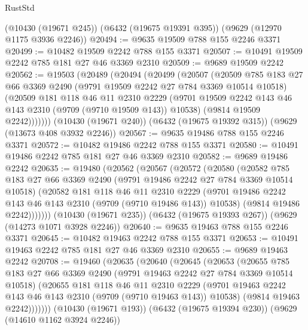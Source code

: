 \begin{lexlean}{RustStd}
\begin{coremodule}
    (@10430 (@19671 @245))
    (@6432 (@19675 @19391 @395))
    (@9629 (@12970 @1175 @3936 @2246))
@20494 := @9635 @19509 @788 @155 @2246 @3371
@20499 := @10482 @19509 @2242 @788 @155 @3371
@20507 := @10491 @19509 @2242 @785 @181 @27 @46 @3369 @2310
@20509 := @9689 @19509 @2242
@20562 := @19503
    (@20489
      (@20494
        (@20499
          (@20507
            (@20509
              @785
              @183
              @27
              @66
              @3369
              @2490
              (@9791 @19509 @2242 @27 @784 @3369 @10514 @10518)
              (@20509
                @181
                @118
                @46
                @11
                @2310
                @2229
                (@9701 @19509 @2242 @143 @46 @143 @2310 (@9709 (@9710 @19509 @143)) @10538)
                (@9814 @19509 @2242)))))))
    (@10430 (@19671 @240))
    (@6432 (@19675 @19392 @315))
    (@9629 (@13673 @408 @3932 @2246))
@20567 := @9635 @19486 @788 @155 @2246 @3371
@20572 := @10482 @19486 @2242 @788 @155 @3371
@20580 := @10491 @19486 @2242 @785 @181 @27 @46 @3369 @2310
@20582 := @9689 @19486 @2242
@20635 := @19480
    (@20562
      (@20567
        (@20572
          (@20580
            (@20582
              @785
              @183
              @27
              @66
              @3369
              @2490
              (@9791 @19486 @2242 @27 @784 @3369 @10514 @10518)
              (@20582
                @181
                @118
                @46
                @11
                @2310
                @2229
                (@9701 @19486 @2242 @143 @46 @143 @2310 (@9709 (@9710 @19486 @143)) @10538)
                (@9814 @19486 @2242)))))))
    (@10430 (@19671 @235))
    (@6432 (@19675 @19393 @267))
    (@9629 (@14273 @1071 @3928 @2246))
@20640 := @9635 @19463 @788 @155 @2246 @3371
@20645 := @10482 @19463 @2242 @788 @155 @3371
@20653 := @10491 @19463 @2242 @785 @181 @27 @46 @3369 @2310
@20655 := @9689 @19463 @2242
@20708 := @19460
    (@20635
      (@20640
        (@20645
          (@20653
            (@20655
              @785
              @183
              @27
              @66
              @3369
              @2490
              (@9791 @19463 @2242 @27 @784 @3369 @10514 @10518)
              (@20655
                @181
                @118
                @46
                @11
                @2310
                @2229
                (@9701 @19463 @2242 @143 @46 @143 @2310 (@9709 (@9710 @19463 @143)) @10538)
                (@9814 @19463 @2242)))))))
    (@10430 (@19671 @193))
    (@6432 (@19675 @19394 @230))
    (@9629 (@14610 @1162 @3924 @2246))

\end{coremodule}
\end{lexlean}
